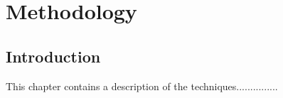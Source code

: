 \chapter{Methodology}

\section{Introduction}
This chapter contains a description of the techniques...............

